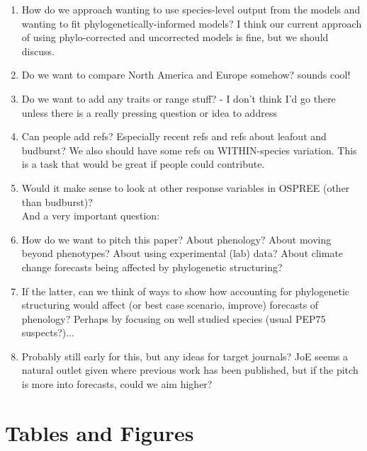 \documentclass{article}\usepackage[]{graphicx}\usepackage[]{color}
\begin{document}
\begin{enumerate}
\item How do we approach wanting to use species-level output from the models and wanting to fit phylogenetically-informed models? I think our current approach of using phylo-corrected and uncorrected models is fine, but we should discuss.
\item Do we want to compare North America and Europe somehow? sounds cool!
\item Do we want to add any traits or range stuff? - I don't think I'd go there unless there is a really pressing question or idea to address
\item Can people add refs? Especially recent refs and refs about leafout and budburst? We also should have some refs on WITHIN-species variation. This is a task that would be great if people could contribute.
\item Would it make sense to look at other response variables in OSPREE (other than budburst)?\\

And a very important question:\\

\item How do we want to pitch this paper? About phenology? About moving beyond phenotypes? About using experimental (lab) data? About climate change forecasts being affected by phylogenetic structuring?

\item If the latter, can we think of ways to show how accounting for phylogenetic structuring would affect (or best case scenario, improve) forecasts of phenology? Perhaps by focusing on well studied species (usual PEP75 suspects?)... 

\item Probably still early for this, but any ideas for target journals? JoE seems a natural outlet given where previous work has been published, but if the pitch is more into forecasts, could we aim higher?

\end{enumerate}






\section*{Tables and Figures} 
\end{document}
